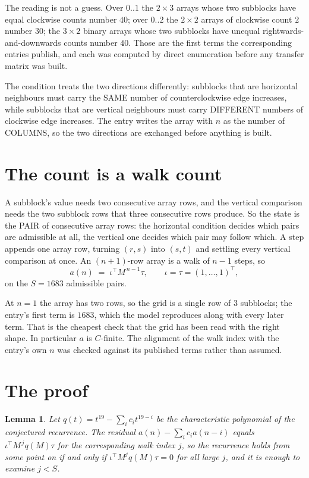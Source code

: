 \documentclass[11pt,a4paper]{article}
\theoremstyle{plain}
\newtheorem{lemma}[theorem]{Lemma}
\theoremstyle{definition}
\begin{document}
The reading is not a guess. Over $0..1$ the $2\times3$ arrays whose two subblocks have equal
clockwise counts number $40$; over $0..2$ the $2\times2$ arrays of clockwise count $2$ number
$30$; the $3\times2$ binary arrays whose two subblocks have unequal rightwards-and-downwards
counts number $40$. Those are the first terms the corresponding entries publish, and each was
computed by direct enumeration before any transfer matrix was built.

The condition treats the two directions differently: subblocks that are horizontal neighbours
must carry the SAME number of counterclockwise edge increases, while subblocks that are vertical neighbours must carry
DIFFERENT numbers of clockwise edge increases. The entry writes the array with $n$ as the number of COLUMNS, so the two directions are exchanged before anything is built.

\section{The count is a walk count}

A subblock's value needs two consecutive array rows, and the vertical
comparison needs the two subblock rows that three consecutive rows produce. So the state is the
PAIR of consecutive array rows: the horizontal condition decides which pairs are admissible at
all, the vertical one decides which pair may follow which. A step appends one array row,
turning $(r,s)$ into $(s,t)$ and settling every vertical comparison at once. An $(n+1)$-row
array is a walk of $n-1$ steps, so
\[
a(n)\;=\;\iota^{\!\top}M^{\,n-1}\tau,\qquad\iota=\tau=(1,\dots,1)^{\!\top},
\]
on the $S=1683$ admissible pairs.

At $n=1$ the array has two rows, so the grid is a single row of $3$
subblocks; the entry's first term is $1683$, which the model
reproduces along with every later term. That is the cheapest check that the grid has been read
with the right shape.
In particular $a$ is $C$-finite. The alignment of the walk index with the entry's own $n$ was
checked against its published terms rather than assumed.

\section{The proof}

\begin{lemma}\label{lem:crit}
Let $q(t)=t^{19}-\sum_i c_it^{19-i}$ be the characteristic polynomial of the
conjectured recurrence. The residual $a(n)-\sum_ic_ia(n-i)$ equals
$\iota^{\!\top}M^{\,j}q(M)\tau$ for the corresponding walk index $j$, so the recurrence
holds from some point on if and only if $\iota^{\!\top}M^{j}q(M)\tau=0$ for all large $j$,
and it is enough to examine $j<S$.
\end{lemma}
\end{document}
